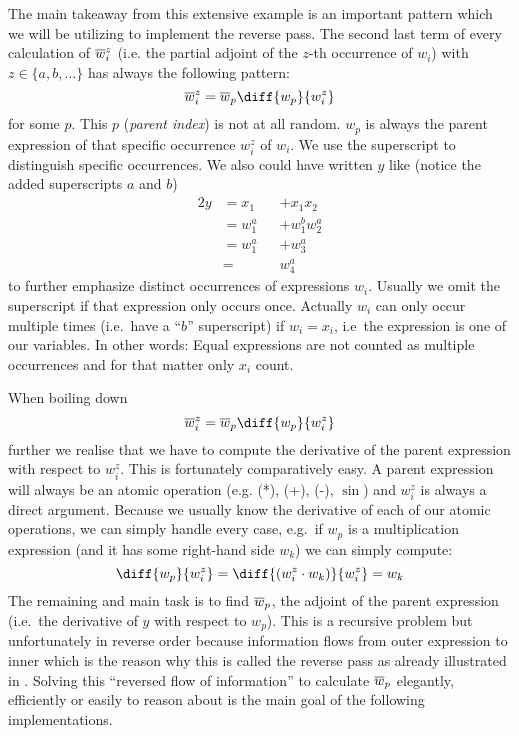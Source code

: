 The main takeaway from this extensive example is an important pattern which we will be utilizing to implement the reverse pass. The second last term of every calculation of $\overline{w}_{i}^z$ (i.e. the partial adjoint of the $z$-th occurrence of $w_i$) with $z \in \{a, b, \dots\}$ has always the following pattern:
\newcommand{\defoverwiz}{\overw{i}^z = \overw{p}\diff{w_p}{w_i^z}}
\[ \defoverwiz \]
for some $p$. This $p$ (\emph{parent index}) is not at all random. $w_p$ is always the parent expression of that specific occurrence $w_i^z$ of $w_i$. We use the superscript to distinguish specific occurrences. We also could have written $y$ like (notice the added superscripts $a$ and $b$)
\begin{alignat*}{2}
    y & = x_1 &  & + x_1 x_2 \\
    & = w_1^a &  & + w_1^b w_2^a \\
    & = w_1^a    &  & + w_3^a       \\
    & =        &  & w_4^a
\end{alignat*}
to further emphasize distinct occurrences of expressions $w_i$. Usually we omit the superscript if that expression only occurs once. Actually $w_i$ can only occur multiple times (i.e.\ have a ``$b$'' superscript) if $w_i = x_i$, i.e\ the expression is one of our variables. In other words: Equal expressions are not counted as multiple occurrences and for that matter only $x_i$ count.

When boiling down
\[ \overw{i}^z = \overw{p}\diff{w_p}{w_i^z}\]
further we realise that we have to compute the derivative of the parent expression with respect to $w_i^z$. This is fortunately comparatively easy. A parent expression will always be an atomic operation (e.g. (*), (+), (-), $\sin$) and $w_i^z$ is always a direct argument. Because we usually know the derivative of each of our atomic operations, we can simply handle every case, e.g.\ if $w_p$ is a multiplication expression (and it has some right-hand side $w_k$) we can simply compute:
\[ \diff{w_p}{w_i^z} = \diff{(w_i^z \cdot w_k)}{w_i^z} = w_k \]
The remaining and main task is to find $\overline{w}_{p}$, the adjoint of the parent expression (i.e.\ the derivative of $y$ with respect to $w_p$). This is a recursive problem but unfortunately in reverse order because information flows from outer expression to inner which is the reason why this is called the reverse pass as already illustrated in . Solving this ``reversed flow of information'' to calculate $\overline{w}_{p}$ elegantly, efficiently or easily to reason about is the main goal of the following implementations.


